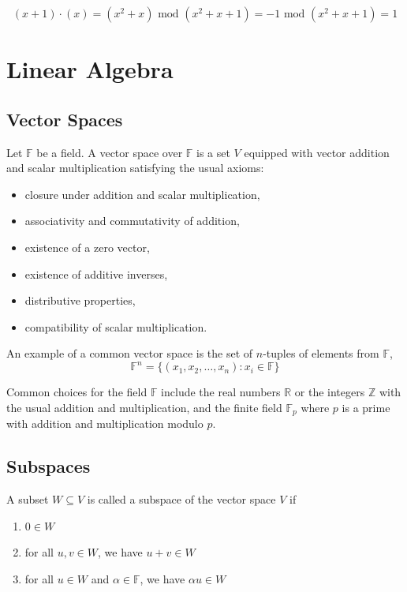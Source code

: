 \[
(x+1)\cdot (x) = (x^2+x) \text{ mod } (x^2+x+1) = -1 \text{ mod } (x^2+x+1) = 1 
\]

\chapter{Linear Algebra}

\section{Vector Spaces}
\label{vector_spaces}
Let \(\mathbb F\) be a field. A vector space over \(\mathbb F\) is a set \(V\)
equipped with vector addition and scalar multiplication satisfying the usual
axioms:

\begin{itemize}
\item closure under addition and scalar multiplication,
\item associativity and commutativity of addition,
\item existence of a zero vector,
\item existence of additive inverses,
\item distributive properties,
\item compatibility of scalar multiplication.
\end{itemize}

An example of a common vector space is the set of \(n\)-tuples of elements from \(\mathbb F\),
\[
\mathbb F^n
=
\{(x_1,x_2,\dots,x_n):x_i\in\mathbb F\}
\]

\vspace{0.4em}
Common choices for the field \(\mathbb F\) include the real numbers 
\(\mathbb R\) or the integers \(\mathbb Z\) with the usual addition and multiplication, 
and the finite field \(\mathbb F_p\) where \(p\) is a prime with addition and multiplication modulo \(p\).

\section{Subspaces}
\label{subspaces}
A subset \(W\subseteq V\) is called a subspace of the vector space \(V\) if

\begin{enumerate}
\item \(0\in W\)
\item for all \(u,v\in W\), we have \(u+v\in W\)
\item for all \(u\in W\) and \(\alpha\in\mathbb F\), we have
      \(\alpha u\in W\)
\end{enumerate}

